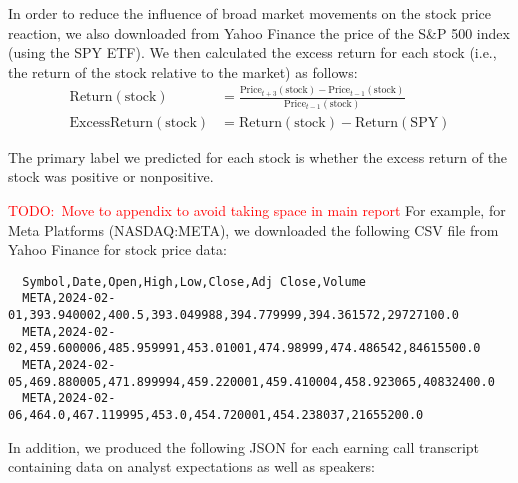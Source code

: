 \documentclass{article}
\newcommand{\TODO}[1]{\textcolor{red}{{TODO:~#1}}}
\begin{document}
In order to reduce the influence of broad market movements on the stock price reaction, we also downloaded from Yahoo Finance the price of the S\&P 500 index (using the SPY ETF).
We then calculated the excess return for each stock (i.e., the return of the stock relative to the market) as follows:
\begin{align*}
  \text{Return}(\text{stock}) &= \frac{\text{Price}_{t+3}(\text{stock})-\text{Price}_{t-1}(\text{stock})}{\text{Price}_{t-1}(\text{stock})} \\
  \text{ExcessReturn}(\text{stock}) &= \text{Return}(\text{stock}) - \text{Return}(\text{SPY})
\end{align*}

The primary label we predicted for each stock is whether the excess return of the stock was positive or nonpositive.

\TODO{Move to appendix to avoid taking space in main report} For example, for Meta Platforms (NASDAQ:META), we downloaded the following CSV file from Yahoo Finance for stock price data:

\begin{verbatim}
  Symbol,Date,Open,High,Low,Close,Adj Close,Volume
  META,2024-02-01,393.940002,400.5,393.049988,394.779999,394.361572,29727100.0
  META,2024-02-02,459.600006,485.959991,453.01001,474.98999,474.486542,84615500.0
  META,2024-02-05,469.880005,471.899994,459.220001,459.410004,458.923065,40832400.0
  META,2024-02-06,464.0,467.119995,453.0,454.720001,454.238037,21655200.0
\end{verbatim}

In addition, we produced the following JSON for each earning call transcript containing data on analyst expectations as well as speakers:
\end{document}
